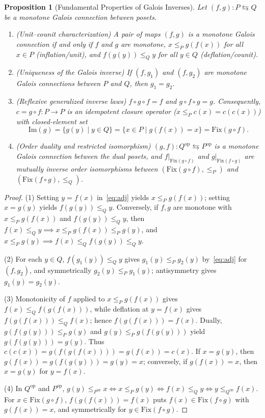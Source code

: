 \documentclass[11pt,a4paper]{article}
\newtheorem{proposition}[theorem]{Proposition}
\theoremstyle{definition}
\theoremstyle{remark}
\begin{document}
\begin{proposition}[Fundamental Properties of Galois Inverses]\label{prop:galois-basic}
Let $(f, g) : P \leftrightarrows Q$ be a monotone Galois connection between posets.
\begin{enumerate}
\item \emph{(Unit--counit characterization)} A pair of maps $(f, g)$ is a monotone Galois connection if and only if $f$ and $g$ are monotone, $x \le_P g(f(x))$ for all $x \in P$ (inflation/unit), and $f(g(y)) \le_Q y$ for all $y \in Q$ (deflation/counit).
\item \emph{(Uniqueness of the Galois inverse)} If $(f, g_1)$ and $(f, g_2)$ are monotone Galois connections between $P$ and $Q$, then $g_1 = g_2$.
\item \emph{(Reflexive generalized inverse laws)} $f \circ g \circ f = f$ and $g \circ f \circ g = g$. Consequently, $c = g \circ f : P \to P$ is an idempotent closure operator ($x \le_P c(x) = c(c(x))$) with closed-element set
\[
\mathrm{Im}(g) = \{ g(y) \mid y \in Q \} = \{ x \in P \mid g(f(x)) = x \} = \mathrm{Fix}(g \circ f).
\]
\item \emph{(Order duality and restricted isomorphism)} $(g, f) : Q^{\mathrm{op}} \leftrightarrows P^{\mathrm{op}}$ is a monotone Galois connection between the dual posets, and $f|_{\mathrm{Fix}(g \circ f)}$ and $g|_{\mathrm{Fix}(f \circ g)}$ are mutually inverse order isomorphisms between $(\mathrm{Fix}(g \circ f), \le_P)$ and $(\mathrm{Fix}(f \circ g), \le_Q)$.
\end{enumerate}
\end{proposition}

\begin{proof}
(1) Setting $y = f(x)$ in~\eqref{eq:adj} yields $x \le_P g(f(x))$; setting $x = g(y)$ yields $f(g(y)) \le_Q y$. Conversely, if $f, g$ are monotone with $x \le_P g(f(x))$ and $f(g(y)) \le_Q y$, then $f(x) \le_Q y \implies x \le_P g(f(x)) \le_P g(y)$, and $x \le_P g(y) \implies f(x) \le_Q f(g(y)) \le_Q y$.

(2) For each $y \in Q$, $f(g_1(y)) \le_Q y$ gives $g_1(y) \le_P g_2(y)$ by~\eqref{eq:adj} for $(f, g_2)$, and symmetrically $g_2(y) \le_P g_1(y)$; antisymmetry gives $g_1(y) = g_2(y)$.

(3) Monotonicity of $f$ applied to $x \le_P g(f(x))$ gives $f(x) \le_Q f(g(f(x)))$, while deflation at $y = f(x)$ gives $f(g(f(x))) \le_Q f(x)$; hence $f(g(f(x))) = f(x)$. Dually, $g(f(g(y))) \le_P g(y)$ and $g(y) \le_P g(f(g(y)))$ yield $g(f(g(y))) = g(y)$. Thus $c(c(x)) = g(f(g(f(x)))) = g(f(x)) = c(x)$. If $x = g(y)$, then $g(f(x)) = g(f(g(y))) = g(y) = x$; conversely, if $g(f(x)) = x$, then $x = g(y)$ for $y = f(x)$.

(4) In $Q^{\mathrm{op}}$ and $P^{\mathrm{op}}$, $g(y) \le_{P^{\mathrm{op}}} x \iff x \le_P g(y) \iff f(x) \le_Q y \iff y \le_{Q^{\mathrm{op}}} f(x)$. For $x \in \mathrm{Fix}(g \circ f)$, $f(g(f(x))) = f(x)$ puts $f(x) \in \mathrm{Fix}(f \circ g)$ with $g(f(x)) = x$, and symmetrically for $y \in \mathrm{Fix}(f \circ g)$.
\end{proof}
\end{document}

